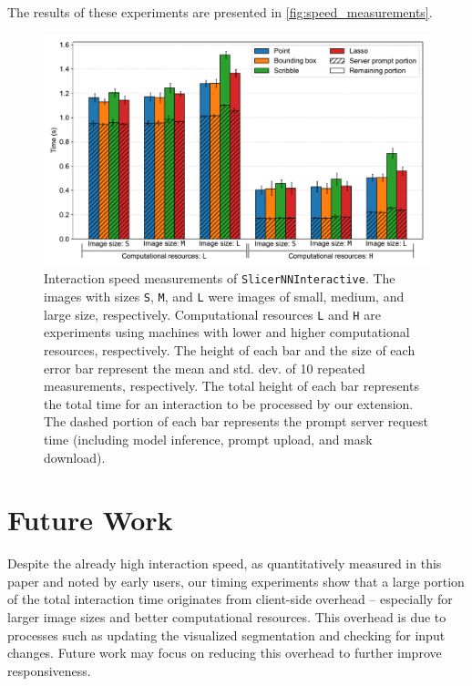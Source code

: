 \documentclass[
]{article}
\begin{document}
The results of these experiments are presented in
\autoref{fig:speed_measurements}.

\begin{figure}
\centering
\includegraphics{img/speed_measurements.pdf}
\caption{Interaction speed measurements of \texttt{SlicerNNInteractive}.
The images with sizes \texttt{S}, \texttt{M}, and \texttt{L} were images
of small, medium, and large size, respectively. Computational resources
\texttt{L} and \texttt{H} are experiments using machines with lower and
higher computational resources, respectively. The height of each bar and
the size of each error bar represent the mean and std. dev. of 10
repeated measurements, respectively. The total height of each bar
represents the total time for an interaction to be processed by our
extension. The dashed portion of each bar represents the prompt server
request time (including model inference, prompt upload, and mask
download).\label{fig:speed_measurements}}
\end{figure}

\section{Future Work}\label{future-work}

Despite the already high interaction speed, as quantitatively measured
in this paper and noted by early users, our timing experiments show that
a large portion of the total interaction time originates from
client-side overhead -- especially for larger image sizes and better
computational resources. This overhead is due to processes such as
updating the visualized segmentation and checking for input changes.
Future work may focus on reducing this overhead to further improve
responsiveness.
\end{document}
